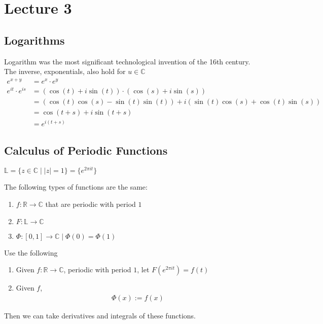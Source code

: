 \section{Lecture 3}
\subsection{Logarithms}
Logarithm was the most significant technological invention of the 16th century. The inverse, exponentials, also hold for $u \in \mathbb{C}$
\begin{align}
    e^{x+y} &= e^x \cdot e^y\\
    e^{it}\cdot e^{is} &= (\cos(t) + i\sin(t)) \cdot (\cos(s) + i\sin(s))\\
    &= (\cos(t)\cos(s) - \sin(t)\sin(t)) + i(\sin(t)\cos(s) + \cos(t)\sin(s))\\
    &= \cos(t+s) + i\sin(t+s)\\
    &= e^{i(t+s)}
\end{align}

\subsection{Calculus of Periodic Functions}
\begin{definition}
    $\mathbb{L} = \{ z \in \mathbb{C} \mid |z| = 1 \} = \{ e^{2\pi it} \}$
\end{definition}
\begin{lemma}
    The following types of functions are the same:
    \begin{enumerate}
        \item $f: \mathbb{R} \to \mathbb{C}$ that are periodic with period $1$
        \item $F: \mathbb{L} \to \mathbb{C}$
        \item $\Phi: [0, 1] \to \mathbb{C} \mid \Phi(0) = \Phi(1)$
    \end{enumerate}
\end{lemma}
Use the following
\begin{enumerate}
    \item Given $f: \mathbb{R} \to \mathbb{C}$, periodic with period $1$, let $F(e^{2\pi it}) = f(t)$  
    \item Given $f$,
    \begin{align}
        \Phi(x) := f(x)
    \end{align}
\end{enumerate}
Then we can take derivatives and integrals of these functions.

